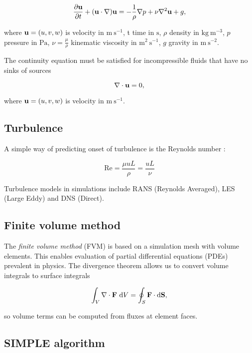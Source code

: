 \documentclass[12pt]{article}
\newcommand{\D}{\text{d}}
\newcommand{\un}[1]{ \text{#1}}
\newcommand{\up}[2]{\text{#1}^{#2}} %
\newcommand{\vb}[1]{\text{\textbf{#1}}}
\begin{document}
\begin{equation}
  \frac{\partial \vb u}{\partial t} + (\vb u \cdot \nabla) \vb u = -\frac{1}{\rho} \nabla p + \nu \nabla^2 \vb u + g,
\end{equation}

where $\vb u = (u, v, w)$ is velocity in $\un{m} \ \up{s}{-1}$, t time in $\un{s}$, $\rho$ density in $\un{kg} \ \up{m}{-3}$, $p$ pressure in $\un{Pa}$, $\nu=\frac{\mu}{\rho}$ kinematic viscosity in $\up{m}{2} \ \up{s}{-1}$, $g$ gravity in $\un{m} \ \up{s}{-2}$.

The continuity equation must be satisfied for incompressible fluids that have no sinks of sources

\begin{equation}
  \nabla \cdot \vb u = 0,
\end{equation}

where $\vb u = (u, v, w)$ is velocity in $\un{m} \ \up{s}{-1}$.

\subsection{Turbulence}

\noindent

A simple way of predicting onset of turbulence is the Reynolds number \cite{tri}:

$$
\text{Re} = \frac{\mu u L}{\rho} = \frac{u L}{\nu}
$$

Turbulence models in simulations include RANS (Reynolds Averaged), LES (Large Eddy) and DNS (Direct).

\subsection{Finite volume method}

The \textit{finite volume method} (FVM) is based on a simulation mesh with volume elements. This enables evaluation of partial differential equations (PDEs) prevalent in physics. The divergence theorem allows us to convert volume integrals to surface integrals

$$
\int_V \nabla \cdot \vb F \ \D V = \oint_S \vb F \cdot \D \vb S,
$$

\noindent
so volume terms can be computed from fluxes at element faces.

\subsection{SIMPLE algorithm}
\end{document}
